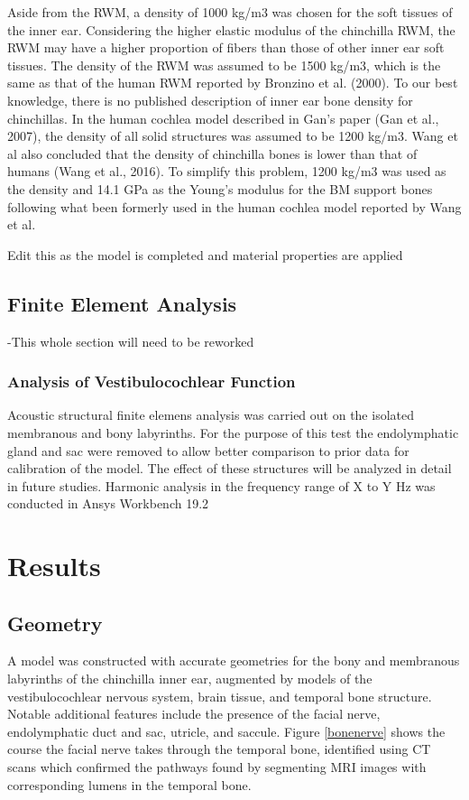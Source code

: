 \documentclass[12pt]{article}
\begin{document}
Aside from the RWM, a density of 1000 kg/m3 was chosen for the soft tissues of the inner ear. Considering the higher elastic modulus of the chinchilla RWM, the RWM may have a higher proportion of fibers than those of other inner ear soft tissues. The density of the RWM was assumed to be 1500 kg/m3, which is the same as that of the human RWM reported by Bronzino et al. (2000). To our best knowledge, there is no published description of inner ear bone density for chinchillas. In the human cochlea model described in Gan’s paper (Gan et al., 2007), the density of all solid structures was assumed to be 1200 kg/m3. Wang et al also concluded that the density of chinchilla bones is lower than that of humans (Wang et al., 2016). To simplify this problem, 1200 kg/m3 was used as the density and 14.1 GPa as the Young’s modulus for the BM support bones following what been formerly used in the human cochlea model reported by Wang et al.

Edit this as the model is completed and material properties are applied


\subsection{Finite Element Analysis}
-This whole section will need to be reworked
\subsubsection{Analysis of Vestibulocochlear Function}
Acoustic structural finite elemens analysis was carried out on the isolated membranous and bony labyrinths. For the purpose of this test the endolymphatic gland and sac were removed to allow better comparison to prior data for calibration of the model. The effect of these structures will be analyzed in detail in future studies. Harmonic analysis in the frequency range of X to Y Hz was conducted in Ansys Workbench 19.2 \cite{ansys}
 



\section{Results}
\subsection{Geometry}
A model was constructed with accurate geometries for the bony and membranous labyrinths of the chinchilla inner ear, augmented by models of the vestibulocochlear nervous system, brain tissue, and temporal bone structure. Notable additional features include the presence of the facial nerve, endolymphatic duct and sac, utricle, and saccule. Figure \ref{bonenerve} shows the course the facial nerve takes through the temporal bone, identified using CT scans which confirmed the pathways found by segmenting MRI images with corresponding lumens in the temporal bone.
\end{document}
